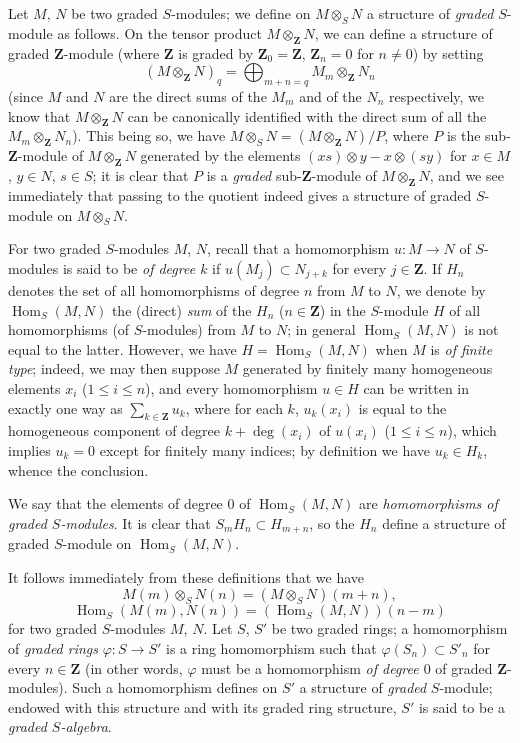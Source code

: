 \begin{env}[2.1.2]
\label{II.2.1.2}
Let $M$, $N$ be two graded $S$-modules; we define on $M\otimes_S N$ a
structure of \emph{graded} $S$-module as follows. On the tensor product
$M\otimes_{\mathbf{Z}}N$, we can define a structure of graded
$\mathbf{Z}$-module (where $\mathbf{Z}$ is graded by
$\mathbf{Z}_0=\mathbf{Z}$, $\mathbf{Z}_n=0$ for $n\ne0$) by setting
\[
  (M\otimes_{\mathbf{Z}}N)_q
  =\bigoplus_{m+n=q}M_m\otimes_{\mathbf{Z}}N_n
\]
(since $M$ and $N$ are the direct sums of the $M_m$ and of the $N_n$
respectively, we know that $M\otimes_{\mathbf{Z}}N$ can be canonically
identified with the direct sum of all the
$M_m\otimes_{\mathbf{Z}}N_n$). This being so, we have
$M\otimes_S N=(M\otimes_{\mathbf{Z}}N)/P$, where $P$ is the
sub-$\mathbf{Z}$-module of $M\otimes_{\mathbf{Z}}N$ generated by the
elements $(xs)\otimes y-x\otimes(sy)$ for $x\in M$, $y\in N$, $s\in S$;
it is clear that $P$ is a \emph{graded} sub-$\mathbf{Z}$-module of
$M\otimes_{\mathbf{Z}}N$, and we see immediately that passing to the
quotient indeed gives a structure of graded $S$-module on $M\otimes_S N$.

For two graded $S$-modules $M$, $N$, recall that a homomorphism
$u:M\to N$ of $S$-modules is said to be \emph{of degree $k$} if
$u(M_j)\subset N_{j+k}$ for every $j\in\mathbf{Z}$. If $H_n$ denotes the
set of all homomorphisms of degree $n$ from $M$ to $N$, we denote by
$\operatorname{Hom}_S(M,N)$ the (direct) \emph{sum} of the $H_n$
($n\in\mathbf{Z}$) in the $S$-module $H$ of all homomorphisms (of
$S$-modules) from $M$ to $N$; in general $\operatorname{Hom}_S(M,N)$ is not
equal to the latter. However, we have $H=\operatorname{Hom}_S(M,N)$ when
$M$ is \emph{of finite type}; indeed, we may then suppose $M$ generated by
finitely many homogeneous elements $x_i$ ($1\leq i\leq n$), and every
homomorphism $u\in H$ can be written in exactly one way as
$\sum_{k\in\mathbf{Z}}u_k$, where for each $k$, $u_k(x_i)$ is equal to the
homogeneous component of degree $k+\deg(x_i)$ of $u(x_i)$ ($1\leq i\leq n$),
which implies $u_k=0$ except for finitely many indices; by definition we
have $u_k\in H_k$, whence the conclusion.

We say that the elements of degree $0$ of $\operatorname{Hom}_S(M,N)$ are
\emph{homomorphisms of graded $S$-modules}. It is clear that
$S_mH_n\subset H_{m+n}$, so the $H_n$ define a structure of graded
$S$-module on $\operatorname{Hom}_S(M,N)$.

It follows immediately from these definitions that we have
\[
  \label{II.2.1.2.1}
  M(m)\otimes_S N(n)=(M\otimes_S N)(m+n),
  \tag{2.1.2.1}
\]
\[
  \label{II.2.1.2.2}
  \operatorname{Hom}_S(M(m),N(n))
  =(\operatorname{Hom}_S(M,N))(n-m)
  \tag{2.1.2.2}
\]
for two graded $S$-modules $M$, $N$.
Let $S$, $S'$ be two graded rings; a homomorphism of \emph{graded
rings} $\varphi:S\to S'$ is a ring homomorphism such that
$\varphi(S_n)\subset S'_n$ for every $n\in\mathbf{Z}$ (in other words,
$\varphi$ must be a homomorphism \emph{of degree $0$} of graded
$\mathbf{Z}$-modules). Such a homomorphism defines on $S'$ a structure of
\emph{graded} $S$-module; endowed with this structure and with its graded
ring structure, $S'$ is said to be a \emph{graded $S$-algebra}.


\end{env}

